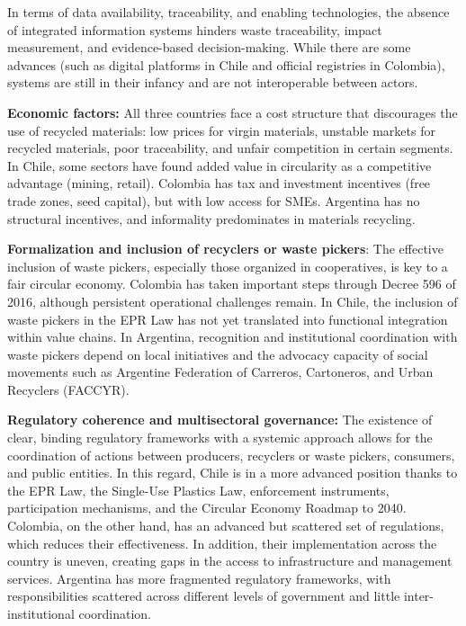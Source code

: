 \documentclass[
  12pt,
  oneside]{book}
\begin{document}
In terms of data availability, traceability, and enabling technologies,
the absence of integrated information systems hinders waste
traceability, impact measurement, and evidence-based decision-making.
While there are some advances (such as digital platforms in Chile and
official registries in Colombia), systems are still in their infancy and
are not interoperable between actors.

\textbf{Economic factors:} All three countries face a cost structure
that discourages the use of recycled materials: low prices for virgin
materials, unstable markets for recycled materials, poor traceability,
and unfair competition in certain segments. In Chile, some sectors have
found added value in circularity as a competitive advantage (mining,
retail). Colombia has tax and investment incentives (free trade zones,
seed capital), but with low access for SMEs. Argentina has no structural
incentives, and informality predominates in materials recycling.

\textbf{Formalization and inclusion of recyclers or waste pickers}: The
effective inclusion of waste pickers, especially those organized in
cooperatives, is key to a fair circular economy. Colombia has taken
important steps through Decree 596 of 2016, although persistent
operational challenges remain. In Chile, the inclusion of waste pickers
in the EPR Law has not yet translated into functional integration within
value chains. In Argentina, recognition and institutional coordination
with waste pickers depend on local initiatives and the advocacy capacity
of social movements such as Argentine Federation of Carreros,
Cartoneros, and Urban Recyclers (FACCYR).

\textbf{Regulatory coherence and multisectoral governance:} The
existence of clear, binding regulatory frameworks with a systemic
approach allows for the coordination of actions between producers,
recyclers or waste pickers, consumers, and public entities. In this
regard, Chile is in a more advanced position thanks to the EPR Law, the
Single-Use Plastics Law, enforcement instruments, participation
mechanisms, and the Circular Economy Roadmap to 2040. Colombia, on the
other hand, has an advanced but scattered set of regulations, which
reduces their effectiveness. In addition, their implementation across
the country is uneven, creating gaps in the access to infrastructure and
management services. Argentina has more fragmented regulatory
frameworks, with responsibilities scattered across different levels of
government and little inter-institutional coordination.
\end{document}

